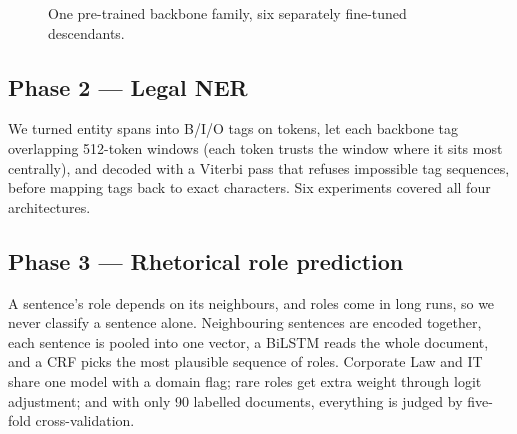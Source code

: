 \documentclass[11pt, oneside]{article}
\begin{document}
\begin{figure}[!t]\centering
{}
\caption{One pre-trained backbone family, six separately fine-tuned descendants.}\label{fig:system}
\end{figure}

\subsection{Phase 2 --- Legal NER}
We turned entity spans into B/I/O tags on tokens, let each backbone tag overlapping 512-token windows (each
token trusts the window where it sits most centrally), and decoded with a Viterbi pass that refuses impossible
tag sequences, before mapping tags back to exact characters.  Six experiments covered all four architectures.

\subsection{Phase 3 --- Rhetorical role prediction}
A sentence's role depends on its neighbours, and roles come in long runs, so we never classify a sentence
alone.  Neighbouring sentences are encoded together, each sentence is pooled into one vector, a BiLSTM reads
the whole document, and a CRF \cite{lafferty2001crf} picks the most plausible sequence of roles.  Corporate
Law and IT share one model with a domain flag; rare roles get extra weight through logit adjustment; and with
only 90 labelled documents, everything is judged by five-fold cross-validation.
\end{document}
